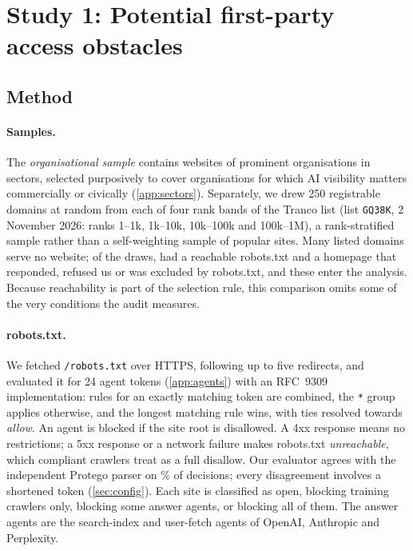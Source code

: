 \documentclass[11pt]{article}
\begin{document}
\section{Study 1: Potential first-party access obstacles}
\label{sec:study1}

\subsection{Method}

\paragraph{Samples.} The \emph{organisational sample} contains \NSites{} websites of prominent organisations in
\NSectors{} sectors, selected purposively to cover organisations for which AI visibility matters commercially or
civically (\cref{app:sectors}). Separately, we drew 250 registrable domains at random from each of four rank bands
of the Tranco list \citep{lepochat2019tranco} (list \texttt{GQ38K}, 2 November 2026: ranks 1--1k, 1k--10k, 10k--100k
and 100k--1M), a rank-stratified sample rather than a self-weighting sample of popular sites. Many listed domains serve
no website; of the \RandDrawn{} draws, \RandSites{} had a reachable robots.txt and a homepage that responded, refused
us or was excluded by robots.txt, and these enter the analysis. Because reachability is part of the selection rule,
this comparison omits some of the very conditions the audit measures.

\paragraph{robots.txt.} We fetched \texttt{/robots.txt} over HTTPS, following up to five redirects, and evaluated it
for 24 agent tokens (\cref{app:agents}) with an RFC~9309 implementation: rules for an exactly matching token are
combined, the \texttt{*} group applies otherwise, and the longest matching rule wins, with ties resolved towards
\emph{allow}. An agent is blocked if the site root is disallowed. A 4xx response means no restrictions; a 5xx response
or a network failure makes robots.txt \emph{unreachable}, which compliant crawlers treat as a full disallow. Our
evaluator agrees with the independent Protego parser on \ProtegoAgree\% of \ProtegoN{} decisions; every disagreement
involves a shortened token (\cref{sec:config}). Each site is classified as open, blocking training crawlers only,
blocking some answer agents, or blocking all of them. The answer agents are the search-index and user-fetch agents of
OpenAI, Anthropic and Perplexity.
\end{document}
